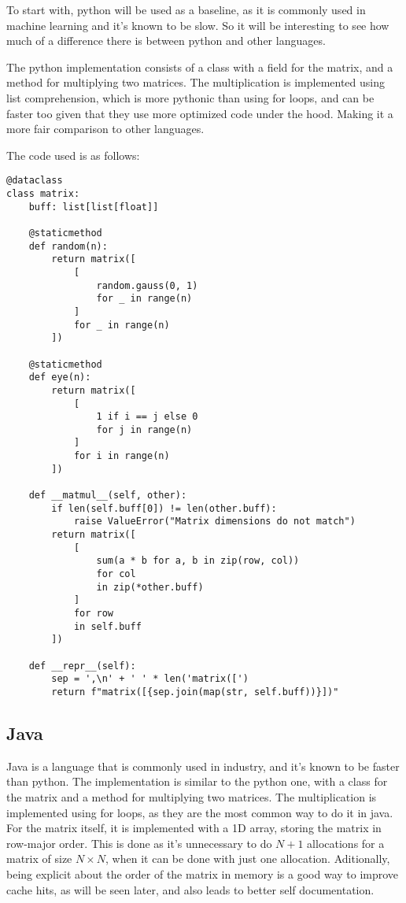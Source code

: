 \documentclass{article}
\begin{document}
To start with, python will be used as a baseline, as it is commonly used in machine learning and it's known to be slow.
So it will be interesting to see how much of a difference there is between python and other languages.

The python implementation consists of a class with a field for the matrix, and a method for multiplying two matrices.
The multiplication is implemented using list comprehension, which is more pythonic than using for loops, and can be faster too
given that they use more optimized code under the hood. Making it a more fair comparison to other languages.

The code used is as follows:

\begin{verbatim}
@dataclass
class matrix:
	buff: list[list[float]]
	
	@staticmethod
	def random(n):
		return matrix([
			[
				random.gauss(0, 1)
				for _ in range(n)
			]
			for _ in range(n)
		])
	
	@staticmethod
	def eye(n):
		return matrix([
			[
				1 if i == j else 0
				for j in range(n)
			]
			for i in range(n)
		])
	
	def __matmul__(self, other):
		if len(self.buff[0]) != len(other.buff):
			raise ValueError("Matrix dimensions do not match")
		return matrix([
			[
				sum(a * b for a, b in zip(row, col))
				for col
				in zip(*other.buff)
			]
			for row
			in self.buff
		])
	
	def __repr__(self):
		sep = ',\n' + ' ' * len('matrix([')
		return f"matrix([{sep.join(map(str, self.buff))}])"
\end{verbatim}

\subsection{Java}

Java is a language that is commonly used in industry, and it's known to be faster than python.
The implementation is similar to the python one, with a class for the matrix and a method for multiplying two matrices.
The multiplication is implemented using for loops, as they are the most common way to do it in java.
For the matrix itself, it is implemented with a 1D array, storing the matrix in row-major order.
This is done as it's unnecessary to do $N+1$ allocations for a matrix of size $N\times N$,
when it can be done with just one allocation. Aditionally, being explicit about the order of the matrix in memory
is a good way to improve cache hits, as will be seen later, and also leads to better self documentation.
\end{document}
